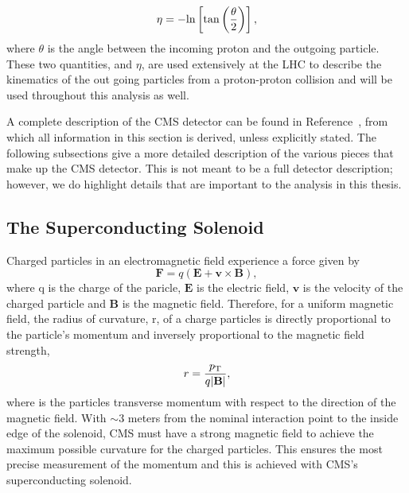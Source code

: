 \begin{equation}
    \eta = - \rm{ln} \left[\rm{tan}\left(\frac{\theta}{2}\right)\right],
\end{equation}
where $\theta$ is the angle between the incoming proton and the outgoing
particle. These two quantities, \pt and $\eta$, are used extensively at the
LHC to describe the kinematics of the out going particles from a proton-proton
collision and will be used throughout this analysis as well.

A complete description of the CMS detector can be found in Reference~\cite{jinst},
from which all information in this section is derived, unless explicitly
stated. The following subsections give a more detailed description of the various
pieces that make up the CMS detector. This is not meant to be a full detector
description; however, we do highlight details that are important to the
analysis in this thesis.

\subsection{The Superconducting Solenoid}
\label {sec:cms_solenoid}
Charged particles in an electromagnetic field experience a force given by
\[
\mathbf{F} = q\left(\mathbf{E} + \mathbf{v}\times\mathbf{B}\right),
\]
where q is the charge of the paricle, $\mathbf{E}$ is the electric field,
$\mathbf{v}$ is the velocity of the charged particle and $\mathbf{B}$ is
the magnetic field. Therefore, for a uniform magnetic field, the radius of
curvature, r, of a charge particles is directly proportional to the particle's
momentum and inversely proportional to the magnetic field strength,
\[
r = \frac{p_{\mathrm{T}}}{q |\mathbf{B}|},
\]
where \pt is the particles transverse momentum with respect to the direction
of the magnetic field. With $\sim$3 meters from the nominal interaction point
to the inside edge of the solenoid, CMS must have a strong magnetic field to
achieve the maximum possible curvature for the charged particles. This ensures
the most precise measurement of the momentum and this is achieved with CMS's
superconducting solenoid.

